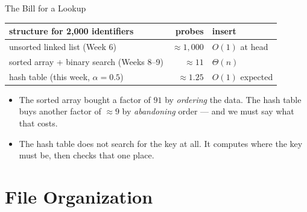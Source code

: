\documentclass[aspectratio=169]{beamer}
\begin{document}
\begin{frame}{The Bill for a Lookup}
  \begin{center}
  {\footnotesize
  \begin{tabular}{l r l}
    \toprule
    \textbf{structure for 2{,}000 identifiers} & \textbf{probes} &
      \textbf{insert} \\
    \midrule
    unsorted linked list (Week 6) & $\approx 1{,}000$ & $O(1)$ at head \\
    sorted array + binary search (Weeks 8--9) & $\approx 11$ & $\Theta(n)$ \\
    hash table (this week, $\alpha = 0.5$) & $\approx 1.25$ & $O(1)$ expected \\
    \bottomrule
  \end{tabular}}
  \end{center}
  \begin{itemize}
    \item The sorted array bought a factor of $91$ by \emph{ordering} the
      data. The hash table buys another factor of $\approx 9$ by
      \emph{abandoning} order --- and we must say what that costs.
    \item The hash table does not search for the key at all. It computes where
      the key must be, then checks that one place.
  \end{itemize}
\end{frame}


\section{File Organization}

\end{document}
